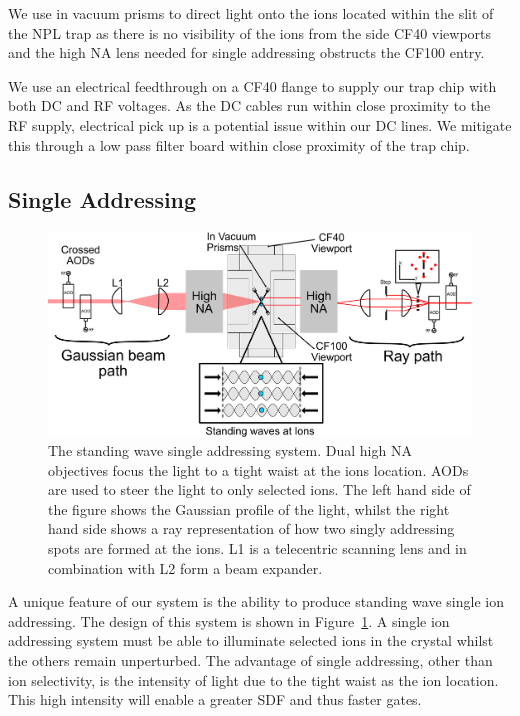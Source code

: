 \documentclass[12pt]{iopart}
\begin{document}
We use in vacuum prisms to direct light onto the ions located within
the slit of the NPL trap as there is no visibility of the ions from
the side CF40 viewports and the high NA lens needed for single
addressing obstructs the CF100 entry.

We use an electrical feedthrough on a CF40 flange to supply our trap
chip with both DC and RF voltages. As the DC cables run within close
proximity to the RF supply, electrical pick up is a potential issue
within our DC lines. We mitigate this through a low pass filter board
within close proximity of the trap chip.


\subsection{Single Addressing}

\begin{figure}
  \begin{center}
   \noindent\includegraphics[width=\linewidth]{figures/vac_can_AOD_small.pdf}
  \end{center}
  \caption{The standing wave single addressing system. Dual high NA
    objectives focus the light to a tight waist at the ions
    location. AODs are used to steer the light to only selected
    ions. The left hand side of the figure shows the Gaussian profile
    of the light, whilst the right hand side shows a ray
    representation of how two singly addressing spots are formed at
    the ions. L1 is a telecentric scanning lens and in combination
    with L2 form a beam expander.}
  \label{fig:AOD}
\end{figure}

A unique feature of our system is the ability to produce standing wave
single ion addressing. The design of this system is shown in
Figure~\ref{fig:AOD}.  A single ion addressing system must be able to
illuminate selected ions in the crystal whilst the others remain
unperturbed. The advantage of single addressing, other than ion
selectivity, is the intensity of light due to the tight waist as the
ion location. This high intensity will enable a greater SDF and thus
faster gates.
\end{document}
